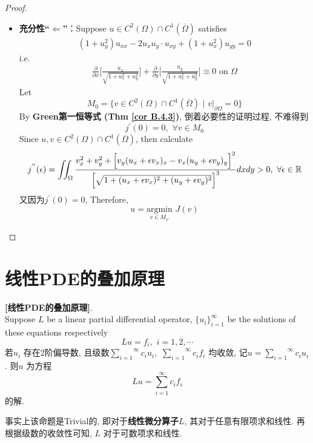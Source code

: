 \begin{thm}
\begin{proof}
\begin{itemize}
				\newpage
				
				\item \textbf{充分性“$\Leftarrow$”}：Suppose $u \in C^2(\Omega) \cap C^1(\overline{\Omega})$ satisfies 
				\begin{align*}
					(1 + u_{y}^2) u_{xx} - 2 u_{x} u_{y} \cdot u_{xy} + (1 + u_{x}^2) u_{yy} = 0
				\end{align*}
				i.e.
				\begin{align*}
					\frac{\partial}{\partial x} \Big[ \frac{u_x}{\sqrt{1 + u_{x}^2 + u_{y}^2}} \Big] + \frac{\partial}{\partial y} \Big[ \frac{u_y}{\sqrt{1 + u_{x}^2 + u_{y}^2}} \Big] \equiv 0 \,\, \text{on} \,\, \Omega
				\end{align*}
				Let 
				\[ M_0 = \Big\{ v \in C^2(\Omega) \cap C^1(\overline{\Omega}) \,\, \Big| \,\, v \big|_{\partial \Omega} = 0 \Big\} \]
				By \textbf{Green第一恒等式 (Thm \ref{cor B.4.3})}, 倒着必要性的证明过程, 不难得到
				\[ j^{'}(0) = 0 , \,\, \forall v \in M_0 \]
				Since $u , v \in C^2(\Omega) \cap C^1(\overline{\Omega})$, then calculate
				\begin{align*}
					j^{''}(\epsilon) 
					= \iint_{\Omega} \frac{v_{x}^2 + v_{y}^2 + \Big[ v_y (u_x + \epsilon v_x)_x - v_{x} (u_y + \epsilon v_y)_y \Big]^2}{\Big[ \sqrt{1 + (u_x + \epsilon v_x)^2 + (u_y + \epsilon v_y)^2} \Big]^3} dxdy > 0 , \,\, \forall \epsilon \in \mathbb{R}
				\end{align*}
				又因为$j^{'}(0) = 0$, Therefore, 
				\[ u = \underset{v \in M_{\varphi}}{\text{argmin}} \,\, J(v) \]
			\end{itemize}
		\end{proof}
	\end{thm}

\newpage

\section{线性PDE的叠加原理}

	\begin{thm}\label{thm A.2.1}
		\textbf{[线性PDE的叠加原理]}. \\
		Suppose $L$ be a linear partial differential operator, $\{ u_i \}_{i = 1}^{\infty}$ be the solutions of these equations respectively 
		\[ Lu = f_{i} , \,\, i = 1 , 2 , \cdots \]
		若$u_i$ 存在2阶偏导数, 且级数$\overset{\infty}{\underset{i = 1}{\sum}} {c_i u_i} , \,\, \overset{\infty}{\underset{i = 1}{\sum}} {c_i f_i}$ 均收敛, 记$u = \overset{\infty}{\underset{i = 1}{\sum}} {c_i u_i}$. 则$u$ 为方程
		\[ Lu = \sum_{i = 1}^{\infty} {c_i f_i} \]
		的解. 
		
		\vspace*{2em}
		
		\begin{rmk}
			事实上该命题是Trivial的, 即对于\textbf{线性微分算子$L$}, 其对于任意有限项求和线性. 再根据级数的收敛性可知, $L$ 对于可数项求和线性. 
		\end{rmk}
	\end{thm}

